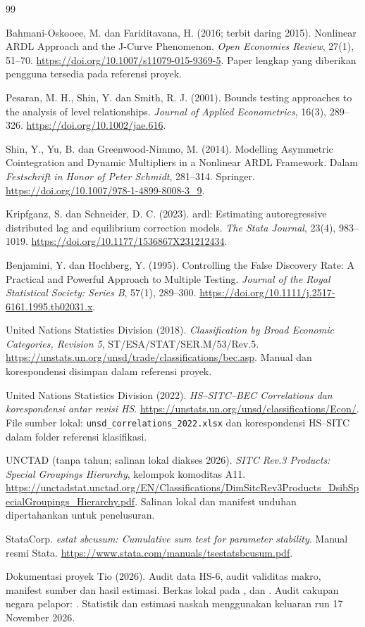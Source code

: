 \begin{thebibliography}{99}
Bahmani-Oskooee, M. dan Fariditavana, H. (2016; terbit daring 2015).
Nonlinear ARDL Approach and the J-Curve Phenomenon.
\emph{Open Economies Review}, 27(1), 51--70.
\url{https://doi.org/10.1007/s11079-015-9369-5}.
Paper lengkap yang diberikan pengguna tersedia pada referensi proyek.

Pesaran, M. H., Shin, Y. dan Smith, R. J. (2001).
Bounds testing approaches to the analysis of level relationships.
\emph{Journal of Applied Econometrics}, 16(3), 289--326.
\url{https://doi.org/10.1002/jae.616}.

Shin, Y., Yu, B. dan Greenwood-Nimmo, M. (2014).
Modelling Asymmetric Cointegration and Dynamic Multipliers in a Nonlinear ARDL Framework.
Dalam \emph{Festschrift in Honor of Peter Schmidt}, 281--314.
Springer. \url{https://doi.org/10.1007/978-1-4899-8008-3_9}.

Kripfganz, S. dan Schneider, D. C. (2023).
ardl: Estimating autoregressive distributed lag and equilibrium correction models.
\emph{The Stata Journal}, 23(4), 983--1019.
\url{https://doi.org/10.1177/1536867X231212434}.

Benjamini, Y. dan Hochberg, Y. (1995).
Controlling the False Discovery Rate: A Practical and Powerful Approach to Multiple Testing.
\emph{Journal of the Royal Statistical Society: Series B}, 57(1), 289--300.
\url{https://doi.org/10.1111/j.2517-6161.1995.tb02031.x}.

United Nations Statistics Division (2018).
\emph{Classification by Broad Economic Categories, Revision 5},
ST/ESA/STAT/SER.M/53/Rev.5.
\url{https://unstats.un.org/unsd/trade/classifications/bec.asp}.
Manual dan korespondensi disimpan dalam referensi proyek.

United Nations Statistics Division (2022).
\emph{HS--SITC--BEC Correlations dan korespondensi antar revisi HS}.
\url{https://unstats.un.org/unsd/classifications/Econ/}.
File sumber lokal: \texttt{unsd\_correlations\_2022.xlsx}
dan korespondensi HS--SITC dalam folder referensi klasifikasi.

UNCTAD (tanpa tahun; salinan lokal diakses 2026).
\emph{SITC Rev.3 Products: Special Groupings Hierarchy},
kelompok komoditas A11.
\url{https://unctadstat.unctad.org/EN/Classifications/DimSitcRev3Products_DsibSpecialGroupings_Hierarchy.pdf}.
Salinan lokal dan manifest unduhan dipertahankan untuk penelusuran.

StataCorp.
\emph{estat sbcusum: Cumulative sum test for parameter stability}.
Manual resmi Stata.
\url{https://www.stata.com/manuals/tsestatsbcusum.pdf}.

Dokumentasi proyek Tio (2026).
Audit data HS-6, audit validitas makro, manifest sumber dan hasil estimasi.
Berkas lokal pada ,
 dan
.
Audit cakupan negara pelapor: .
Statistik dan estimasi naskah menggunakan keluaran run 17 November 2026.
\end{thebibliography}
